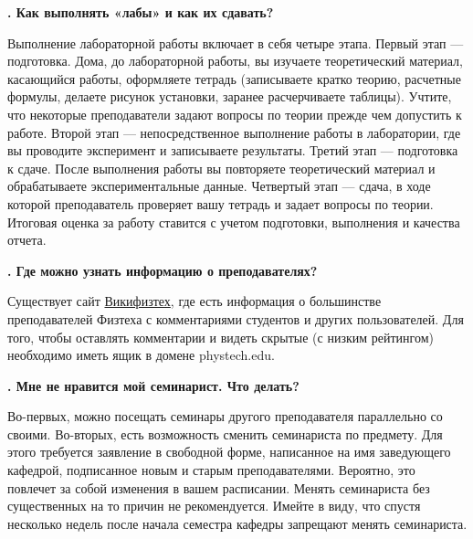 \documentclass[14pt]{extarticle}
\newcounter{question}
\newcommand\Que[1]{%
    \begin{minipage}{\textwidth}
    \leavevmode\par
    \stepcounter{question}
    \noindent
    {\large\textbf{\thequestion. #1}}\par}
\newcommand\Ans[2][]{%
    \leavevmode\par\noindent
    {\leftskip37pt
    \textbf{#1}#2\par}
    \end{minipage}}
\begin{document}
\Que{Как выполнять «лабы» и как их сдавать?}
\Ans{Выполнение лабораторной работы включает в себя четыре этапа. Первый этап — подготовка. Дома, до лабораторной работы, вы изучаете теоретический материал, касающийся работы, оформляете тетрадь (записываете кратко теорию, расчетные формулы, делаете рисунок установки, заранее расчерчиваете таблицы). Учтите, что некоторые преподаватели задают вопросы по теории прежде чем допустить к работе. Второй этап — непосредственное выполнение работы в лаборатории, где вы проводите эксперимент и записываете результаты. Третий этап — подготовка к сдаче. После выполнения работы вы повторяете теоретический материал и обрабатываете экспериментальные данные. Четвертый этап — сдача, в ходе которой преподаватель проверяет вашу тетрадь и задает вопросы по теории. Итоговая оценка за работу ставится с учетом подготовки, выполнения и качества отчета.}

\Que{Где можно узнать информацию о преподавателях?}
\Ans{Существует сайт \href{http://wikimipt.org}{Викифизтех}, где есть информация о большинстве преподавателей Физтеха с комментариями студентов и других пользователей. Для того, чтобы оставлять комментарии и видеть скрытые (с низким рейтингом) необходимо иметь ящик в домене phystech.edu.}

\Que{Мне не нравится мой семинарист. Что делать?}
\Ans{Во-первых, можно посещать семинары другого преподавателя параллельно со своими. Во-вторых, есть возможность сменить семинариста по предмету. Для этого требуется заявление в свободной форме, написанное на имя заведующего кафедрой, подписанное новым и старым преподавателями. Вероятно, это повлечет за собой изменения в вашем расписании. Менять семинариста без существенных на то причин не рекомендуется. Имейте в виду, что спустя несколько недель после начала семестра кафедры запрещают менять семинариста.}
\end{document}
